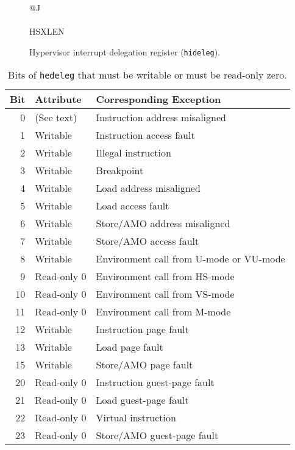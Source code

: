 \begin{figure}[h!]
{\footnotesize
\begin{center}
\begin{tabular}{@{}J}
 \\
\hline
{} \\
\hline
HSXLEN \\
\end{tabular}
\end{center}
}
\vspace{-0.1in}
\caption{Hypervisor interrupt delegation register ({\tt hideleg}).}
\label{hidelegreg}
\end{figure}

\begin{table*}[h!]
\begin{center}
\begin{tabular}{|r|l|l|}
\hline
Bit & Attribute   & Corresponding Exception \\
\hline
 0  & (See text)  & Instruction address misaligned \\
 1  & Writable    & Instruction access fault \\
 2  & Writable    & Illegal instruction \\
 3  & Writable    & Breakpoint \\
 4  & Writable    & Load address misaligned \\
 5  & Writable    & Load access fault \\
 6  & Writable    & Store/AMO address misaligned \\
 7  & Writable    & Store/AMO access fault \\
 8  & Writable    & Environment call from U-mode or VU-mode \\
 9  & Read-only 0 & Environment call from HS-mode \\
10  & Read-only 0 & Environment call from VS-mode \\
11  & Read-only 0 & Environment call from M-mode \\
12  & Writable    & Instruction page fault \\
13  & Writable    & Load page fault \\
15  & Writable    & Store/AMO page fault \\
20  & Read-only 0 & Instruction guest-page fault \\
21  & Read-only 0 & Load guest-page fault \\
22  & Read-only 0 & Virtual instruction \\
23  & Read-only 0 & Store/AMO guest-page fault \\
\hline
\end{tabular}
\end{center}
\caption{Bits of {\tt hedeleg} that must be writable or must be read-only
zero.}
\label{tab:hedeleg-bits}
\end{table*}

